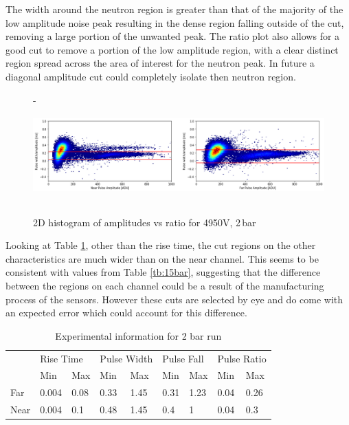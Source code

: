 \documentclass[a4paper]{article}
\begin{document}
\noindent The width around the neutron region is greater than that of the majority of the low amplitude noise peak resulting in the dense region falling outside of the cut, removing a large portion of the unwanted peak.
\newline The ratio plot also allows for a good cut to remove a portion of the low amplitude region, with a clear distinct region spread across the area of interest for the neutron peak. In future a diagonal amplitude cut could completely isolate then neutron region.
\begin{figure}[H]-
    \centering
    \includegraphics[height=3.7cm]{plots/uk26n000_len.png}
    \caption{2D histogram of amplitudes vs ratio  for 4950V, 2\,bar}
    \label{fig:3len}
\end{figure}
\noindent Looking at Table \ref{tb:2bar}, other than the rise time, the cut regions on the other characteristics are much wider than on the near channel. This seems to be consistent with values from Table \ref{tb:15bar}, suggesting that the difference between the regions on each channel could be a result of the manufacturing process of the sensors. However these cuts are selected by eye and do come with an expected error which could account for this difference.
\begin{table}[H]
\centering
\caption{Experimental information for 2 bar run}
\label{tb:2bar}
\begin{tabular}{|l|ll|ll|ll|ll|} 
\cline{2-9}
\multicolumn{1}{l|}{} & \multicolumn{2}{l|}{Rise Time} & \multicolumn{2}{l|}{Pulse Width} & \multicolumn{2}{l|}{Pulse Fall} & \multicolumn{2}{l|}{Pulse Ratio}  \\ 
\cline{2-9}
\multicolumn{1}{l|}{} & \multicolumn{1}{l|}{Min} & Max                                   & \multicolumn{1}{l|}{Min} & Max                                     & \multicolumn{1}{l|}{Min} & Max                                    & \multicolumn{1}{l|}{Min} & Max                                                \\ 
\hline
Far                   & 0.004                    & 0.08                                  & 0.33                     & 1.45                                    & 0.31                     & 1.23                                   & 0.04                     & 0.26                                               \\ 
\hline
Near                  & 0.004                    & 0.1                                   & 0.48                     & 1.45                                    & 0.4                      & 1                                      & 0.04                     & 0.3                                                \\
\hline
\end{tabular}
\end{table}
\end{document}
